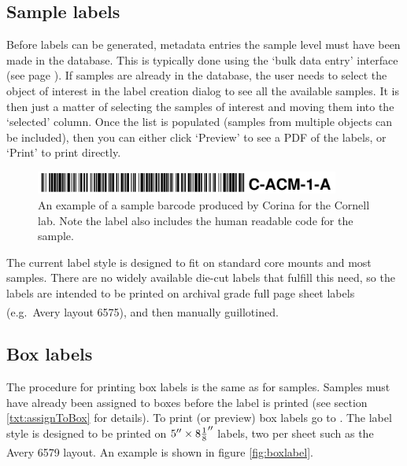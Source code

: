\subsection{Sample labels}
Before labels can be generated, metadata entries the sample level must have been made in the database.  This is typically done using the `bulk data entry' interface (see page \pageref{txt:bulkentry}).  If samples are already in the database, the user needs to select the object of interest in the label creation dialog to see all the available samples.  It is then just a matter of selecting the samples of interest and moving them into the `selected' column.  Once the list is populated (samples from multiple objects can be included), then you can either click `Preview' to see a PDF of the labels, or `Print' to print directly.

\begin{figure}[hbtp]
  \centering
    \includegraphics[width=100mm]{Images/samplebarcode.png}
    \caption{An example of a sample barcode produced by Corina for the Cornell lab.  Note the label also includes the human readable code for the sample.}
    \label{fig:graph}
\end{figure}

The current label style is designed to fit on standard core mounts and most samples.  There are no widely available die-cut labels that fulfill this need, so the labels are intended to be printed on archival grade full page sheet labels (e.g.\ Avery\textsuperscript{\textregistered} layout 6575), and then manually guillotined.  

\subsection{Box labels}
The procedure for printing box labels is the same as for samples.  Samples must have already been assigned to boxes before the label is printed (see section \ref{txt:assignToBox} for details).  To print (or preview) box labels go to .  The label style is designed to be printed on $5'' \times 8{1 \over 8}''$ labels, two per sheet such as the Avery\textsuperscript{\textregistered} 6579 layout.  An example is shown in figure \ref{fig:boxlabel}.


